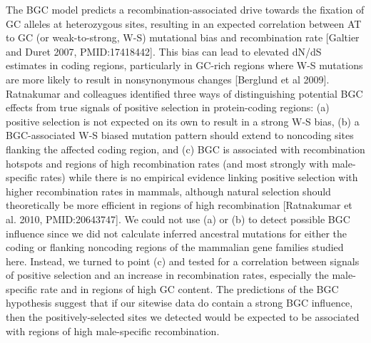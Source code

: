 The BGC model predicts a recombination-associated drive towards the
fixation of GC alleles at heterozygous sites, resulting in an expected
correlation between AT to GC (or weak-to-strong, W-S) mutational bias
and recombination rate [Galtier and Duret 2007, PMID:17418442]. This
bias can lead to elevated dN/dS estimates in coding regions,
particularly in GC-rich regions where W-S mutations are more likely to
result in nonsynonymous changes [Berglund et al 2009]. Ratnakumar and
colleagues identified three ways of distinguishing potential BGC
effects from true signals of positive selection in protein-coding
regions: (a) positive selection is not expected on its own to result
in a strong W-S bias, (b) a BGC-associated W-S biased mutation pattern
should extend to noncoding sites flanking the affected coding region,
and (c) BGC is associated with recombination hotspots and regions of
high recombination rates (and most strongly with male-specific rates)
while there is no empirical evidence linking positive selection with
higher recombination rates in mammals, although natural selection
should theoretically be more efficient in regions of high
recombination [Ratnakumar et al. 2010, PMID:20643747]. We could not
use (a) or (b) to detect possible BGC influence since we did not
calculate inferred ancestral mutations for either the coding or
flanking noncoding regions of the mammalian gene families studied
here. Instead, we turned to point (c) and tested for a correlation
between signals of positive selection and an increase in recombination
rates, especially the male-specific rate and in regions of high GC
content. The predictions of the BGC hypothesis suggest that if our
sitewise data do contain a strong BGC influence, then the
positively-selected sites we detected would be expected to be
associated with regions of high male-specific recombination.

